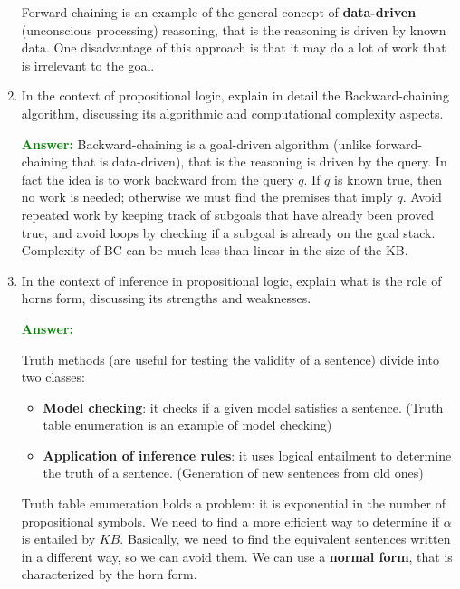 \documentclass[12pt]{article}
\begin{document}
\begin{enumerate}[label=\textbf{PL.\arabic*}]
    Forward-chaining is an example of the general concept of \textbf{data-driven} (unconscious processing) reasoning, that is the reasoning is driven by known data.
    One disadvantage of this approach is that it may do a lot of work that is irrelevant to the goal.

    \item In the context of propositional logic, explain in detail the Backward-chaining algorithm, discussing its algorithmic and computational complexity aspects.
    
    \textcolor{green}{\textbf{Answer:}}
    Backward-chaining is a goal-driven algorithm (unlike forward-chaining that is data-driven), that is the reasoning is driven by the query.
    In fact the idea is to work backward from the query $q$.
    If $q$ is known true, then no work is needed; otherwise we must find the premises that imply $q$.
    Avoid repeated work by keeping track of subgoals that have already been proved true, 
    and avoid loops by checking if a subgoal is already on the goal stack.
    Complexity of BC can be much less than linear in the size of the KB\@.
    \item In the context of inference in propositional logic, explain what is the role of horns form, discussing its strengths and weaknesses.
    
    \textcolor{green}{\textbf{Answer:}}
    
    Truth methods (are useful for testing the validity of a sentence) divide into two classes:
    \begin{itemize}
        \item \textbf{Model checking}: it checks if a given model satisfies a sentence. (Truth table enumeration is an example of model checking)
        \item \textbf{Application of inference rules}: it uses logical entailment to determine the truth of a sentence. (Generation of new sentences from old ones)
    \end{itemize}

    Truth table enumeration holds a problem: it is exponential in the number of propositional symbols.
    We need to find a more efficient way to determine if $\alpha$ is entailed by $KB$.
    Basically, we need to find the equivalent sentences written in a different way, so we can avoid them.
    We can use a \textbf{normal form}, that is characterized by the horn form.


\end{enumerate}
\end{document}
